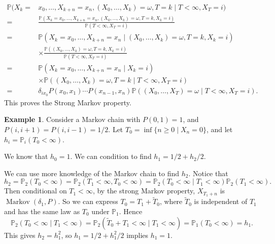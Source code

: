 \documentclass[12pt]{article}
\DeclareMathOperator{\Mkv}{Markov}
\theoremstyle{definition}
\newtheorem{example}{Example}[section]
\theoremstyle{remark}
\begin{document}
\begin{adjustbox}{minipage = \columnwidth - 25.5pt, margin=1em, frame=1pt, margin=0em}
\begin{align*}
	\mathbb{P}(X_k =& x_0, \ldots, X_{k+n} = x_n, (X_0, \ldots, X_k) = \omega, T = k \mid T < \infty, X_T = i) \\
	= & \frac{\mathbb{P}(X_k = x_0, \ldots, X_{k+n} = x_n, (X_0, \ldots, X_k) = \omega, T = k, X_k = i)}{\mathbb{P}(T < \infty, X_T = i)} \\
	= & \mathbb{P}(X_k = x_0, \ldots, X_{k+n} = x_n \mid (X_0, \ldots, X_k) = \omega, T = k, X_k = i)\\
	  & \times \frac{\mathbb{P}((X_0, \ldots, X_k) = \omega, T = k, X_k = i)}{\mathbb{P}(T < \infty, X_T = i)} \\
	= &\mathbb{P}(X_k = x_0, \ldots, X_{k+n} = x_n \mid X_k = i) \\
	  & \times \mathbb{P}((X_0, \ldots, X_k) = \omega, T = k \mid T < \infty, X_T = i) \\
	= & \delta_{ix_0}P(x_0, x_1) \cdots P(x_{n-1}, x_n) \mathbb{P}((X_0, \ldots, X_T) = \omega \mid T < \infty, X_T = i).
\end{align*}
This proves the Strong Markov property.
\end{adjustbox}

\begin{adjustbox}{minipage = \columnwidth - 25.5pt, margin=1em, frame=1pt, margin=0em}
\begin{example}
	Consider a Markov chain with $P(0, 1) = 1$, and $P(i, i+1) = P(i, i-1) = 1/2$. Let $T_0 = \inf\{n \geq 0 \mid X_n = 0\}$, and let $h_i = \mathbb{P}_i(T_0 < \infty)$.

	We know that $h_0 = 1$. We can condition to find $h_1 = 1/2 + h_2/2$.

	We can use more knowledge of the Markov chain to find $h_2$. Notice that
	\[
		h_2 = \mathbb{P}_2(T_0 < \infty) = \mathbb{P}_2(T_1 < \infty, T_0 < \infty) = \mathbb{P}_2(T_0 < \infty \mid T_1 < \infty) \mathbb{P}_2(T_1 < \infty)
	.\]
	Then conditional on $T_1 < \infty$, by the strong Markov property, $X_{T_1 + n}$ is $\Mkv(\delta_1, P)$. So we can express $T_0 = T_1 + \tilde T_0$, where $\tilde T_0$ is independent of $T_1$ and has the same law as $T_0$ under $\mathbb{P}_1$. Hence
	\[
		\mathbb{P}_2(T_0 < \infty \mid T_1 < \infty) = \mathbb{P}_2(\tilde T_0 + T_1 < \infty \mid T_1 < \infty) = \mathbb{P}_1(T_0 < \infty) = h_1
	.\]
	This gives $h_2 = h_1^2$, so $h_1 = 1/2 +h_1^2/2$ implies $h_1 = 1$.
\end{example}

\end{adjustbox}
\end{document}
